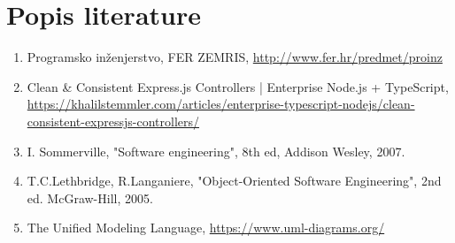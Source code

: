 \chapter*{Popis literature}
	 	
		\begin{enumerate}
			
			
			\item  Programsko inženjerstvo, FER ZEMRIS, \url{http://www.fer.hr/predmet/proinz}
			
			\item Clean \& Consistent Express.js Controllers | Enterprise Node.js + TypeScript, \url{https://khalilstemmler.com/articles/enterprise-typescript-nodejs/clean-consistent-expressjs-controllers/}
			
			\item  I. Sommerville, "Software engineering", 8th ed, Addison Wesley, 2007.
			
			\item  T.C.Lethbridge, R.Langaniere, "Object-Oriented Software Engineering", 2nd ed. McGraw-Hill, 2005.
			
			\item  The Unified Modeling Language, \url{https://www.uml-diagrams.org/}
			
		\end{enumerate}
		
		 